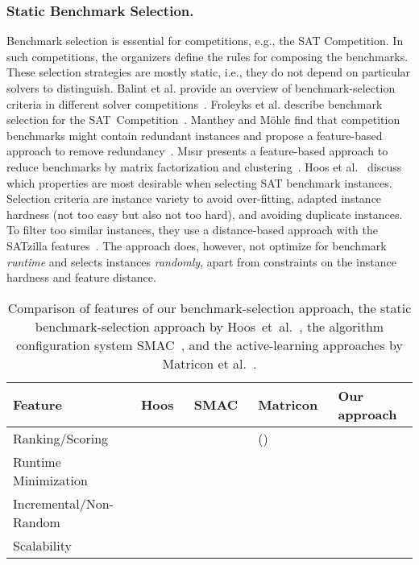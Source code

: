 \documentclass[runningheads]{llncs}
\newcommand{\cmark}{\ding{51}} %
\newcommand{\xmark}{\ding{55}}
\begin{document}
\subsubsection{Static Benchmark Selection.}

Benchmark selection is essential for competitions, e.g., the SAT Competition.
In such competitions, the organizers define the rules for composing the benchmarks.
These selection strategies are mostly static, i.e., they do not depend on particular solvers to distinguish.
Balint et al. provide an overview of benchmark-selection criteria in different solver competitions~\cite{balint2015overview}.
Froleyks et al. describe benchmark selection for the SAT~Competition~\cite{FroleyksHIJS21}.
Manthey and Möhle find that competition benchmarks might contain redundant instances and propose a feature-based approach to remove redundancy~\cite{manthey2016better}.
M{\i}s{\i}r presents a feature-based approach to reduce benchmarks by matrix factorization and clustering~\cite{misir2021benchmark}.
Hoos et al.~\cite{HoosKSS13} discuss which properties are most desirable when selecting SAT benchmark instances.
Selection criteria are instance variety to avoid over-fitting, adapted instance hardness (not too easy but also not too hard), and avoiding duplicate instances.
To filter too similar instances, they use a distance-based approach with the SATzilla features~\cite{XuHHL08,features}.
The approach does, however, not optimize for benchmark \emph{runtime} and selects instances \emph{randomly}, apart from constraints on the instance hardness and feature distance.

\begin{table}[tbp]
  \centering
  \begin{tabular}{
    m{}
    >{\centering\arraybackslash}m{}
    >{\centering\arraybackslash}m{}
    >{\centering\arraybackslash}m{}
    >{\centering\arraybackslash}m{}
  }
    \hline
    Feature & Hoos~\cite{HoosKSS13} & SMAC~\cite{HutterHL11} & Matricon~\cite{MatriconAFSH21} & Our approach \\
    \hline
    Ranking/Scoring & \cmark & \xmark & (\cmark) & \cmark \\
    Runtime Minimization & \xmark & \cmark & \cmark & \cmark \\
    Incremental/Non-Random & \xmark & \xmark & \cmark & \cmark \\
    Scalability & \cmark & \cmark & \xmark & \cmark \\
    \hline
  \end{tabular}
  ~\\[1em]
  \caption{Comparison of features of our benchmark-selection approach, the static benchmark-selection approach by Hoos~et~al.~\cite{HoosKSS13}, the algorithm configuration system SMAC~\cite{HutterHL11}, and the active-learning approaches by Matricon et al.~\cite{MatriconAFSH21}.
  }
  \label{tab:requirements}
\end{table}
\end{document}
